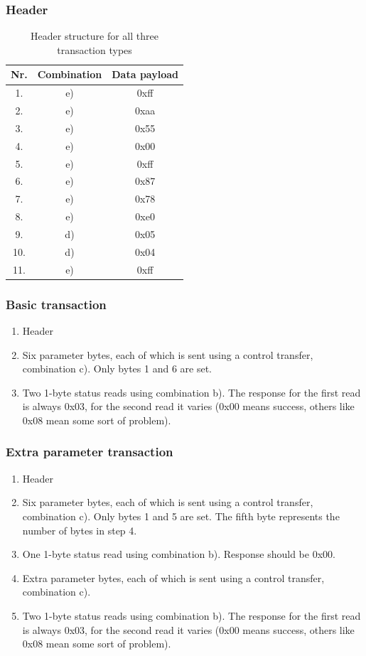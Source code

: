 \documentclass{article}
\begin{document}
\subsubsection{Header}

\begin{table}[H]
  \caption{Header structure for all three transaction types}
  \centering
  \begin{tabular}{c | c | c}
    Nr. & Combination & Data payload \\ \hline
    1. & e) & 0xff \\
    2. & e) & 0xaa \\
    3. & e) & 0x55 \\
    4. & e) & 0x00 \\
    5. & e) & 0xff \\
    6. & e) & 0x87 \\
    7. & e) & 0x78 \\
    8. & e) & 0xe0 \\
    9. & d) & 0x05 \\
    10. & d) & 0x04 \\
    11. & e) & 0xff \\
  \end{tabular}
\end{table}

\subsubsection{Basic transaction}

\begin{enumerate}
  \item Header
  \item Six parameter bytes, each of which is sent using a control transfer, combination c).
        Only bytes 1 and 6 are set.
  \item Two 1-byte status reads using combination b). The response for the first read is always 0x03,
        for the second read it varies (0x00 means success, others like 0x08 mean some sort of problem).
\end{enumerate}

\subsubsection{Extra parameter transaction}

\begin{enumerate}
  \item Header
  \item Six parameter bytes, each of which is sent using a control transfer, combination c).
        Only bytes 1 and 5 are set.
        The fifth byte represents the number of bytes in step 4.
  \item One 1-byte status read using combination b). Response should be 0x00.
  \item Extra parameter bytes, each of which is sent using a control transfer, combination c).
  \item Two 1-byte status reads using combination b). The response for the first read is always 0x03,
        for the second read it varies (0x00 means success, others like 0x08 mean some sort of problem).
\end{enumerate}
\end{document}
